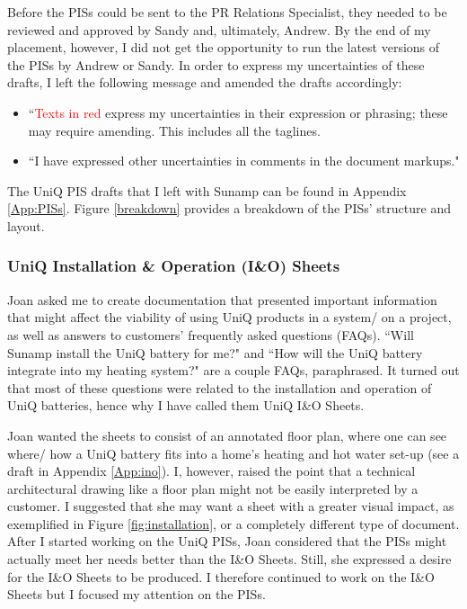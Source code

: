 Before the PISs could be sent to the PR Relations Specialist, they needed to be reviewed and approved by Sandy and, ultimately, Andrew.
By the end of my placement, however, I did not get the opportunity to run the latest versions of the PISs by Andrew or Sandy.
In order to express my uncertainties of these drafts, I left the following message and amended the drafts accordingly:
\begin{itemize}
    \item ``\textcolor{red}{Texts in red} express my uncertainties in their expression or phrasing; these may require amending. This includes all the taglines.
    \item ``I have expressed other uncertainties in comments in the document markups."
\end{itemize}

The UniQ PIS drafts that I left with Sunamp can be found in Appendix \ref{App:PISs}.
Figure \ref{breakdown} provides a breakdown of the PISs' structure and layout.



\subsubsection{UniQ Installation \& Operation (I\&O) Sheets}

Joan asked me to create documentation that presented important information that might affect the viability of using UniQ products in a system/ on a project, as well as answers to customers' frequently asked questions (FAQs).
``Will Sunamp install the UniQ battery for me?" and ``How will the UniQ battery integrate into my heating system?" are a couple FAQs, paraphrased.
It turned out that most of these questions were related to the installation and operation of UniQ batteries, hence why I have called them UniQ I\&O Sheets.

Joan wanted the sheets to consist of an annotated floor plan, where one can see where/ how a UniQ battery fits into a home's heating and hot water set-up (see a draft in Appendix \ref{App:ino}).
I, however, raised the point that a technical architectural drawing like a floor plan might not be easily interpreted by a customer.
I suggested that she may want a sheet with a greater visual impact, as exemplified in Figure \ref{fig:installation}, or a completely different type of document.
After I started working on the UniQ PISs, Joan considered that the PISs might actually meet her needs better than the I\&O Sheets.
Still, she expressed a desire for the I\&O Sheets to be produced.
I therefore continued to work on the I\&O Sheets but I focused my attention on the PISs.

